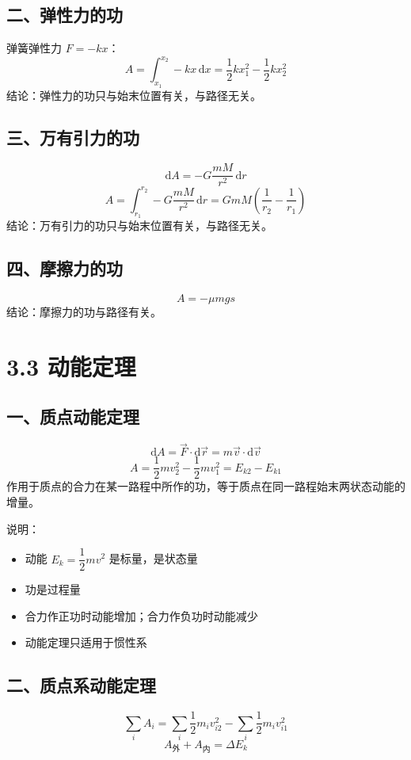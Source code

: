 \documentclass{ctexart}
\begin{document}
\subsection*{二、弹性力的功}
弹簧弹性力 $F = -kx$：
\[
A = \int_{x_1}^{x_2} -kx\,\mathrm{d}x = \frac12 kx_1^{2} - \frac12 kx_2^{2}
\]
结论：弹性力的功只与始末位置有关，与路径无关。

\subsection*{三、万有引力的功}
\[
\mathrm{d}A = -G\frac{mM}{r^{2}}\,\mathrm{d}r
\]
\[
A = \int_{r_1}^{r_2} -G\frac{mM}{r^{2}}\,\mathrm{d}r = GmM\left(\frac{1}{r_2} - \frac{1}{r_1}\right)
\]
结论：万有引力的功只与始末位置有关，与路径无关。

\subsection*{四、摩擦力的功}
\[
A = -\mu mg s
\]
结论：摩擦力的功与路径有关。

\section*{3.3 动能定理}

\subsection*{一、质点动能定理}
\[
\mathrm{d}A = \vec{F}\cdot\mathrm{d}\vec{r} = m\vec{v}\cdot\mathrm{d}\vec{v}
\]
\[
A = \frac12 mv_2^{2} - \frac12 mv_1^{2} = E_{k2} - E_{k1}
\]
作用于质点的合力在某一路程中所作的功，等于质点在同一路程始末两状态动能的增量。

说明：
\begin{itemize}
  \item 动能 $E_k = \dfrac12 mv^{2}$ 是标量，是状态量
  \item 功是过程量
  \item 合力作正功时动能增加；合力作负功时动能减少
  \item 动能定理只适用于惯性系
\end{itemize}

\subsection*{二、质点系动能定理}
\[
\sum_i A_i = \sum_i \frac12 m_i v_{i2}^{2} - \sum_i \frac12 m_i v_{i1}^{2}
\]
\[
A_{\text{外}} + A_{\text{内}} = \Delta E_k
\]
\end{document}
